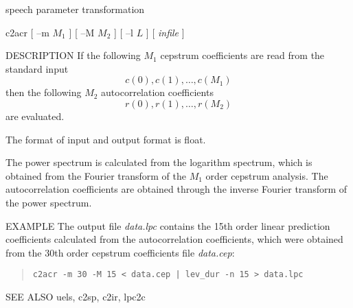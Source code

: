 %
{speech parameter transformation}

\begin{synopsis}
\item[c2acr] [ --m $M_1$ ] [ --M $M_2$ ] [ --l $L$ ] [ {\em infile} ]
\end{synopsis}

\begin{qsection}{DESCRIPTION}
If the following $M_1$ cepstrum coefficients
are read from the standard input
\begin{displaymath}
c(0), c(1), \ldots, c(M_1)
\end{displaymath}
then the following $M_2$ autocorrelation coefficients
\begin{displaymath}
r(0), r(1), \ldots, r(M_2)
\end{displaymath}
are evaluated.
\par
The format of input and output format is float.
\par
The power spectrum is calculated from the logarithm spectrum,
which is obtained from the Fourier transform of the $M_1$
order cepstrum analysis.
The autocorrelation coefficients are obtained through the inverse
Fourier transform of the power spectrum.
\end{qsection}

\begin{options}
\end{options}

\begin{qsection}{EXAMPLE}
The output file {\em data.lpc} contains the 15th order linear prediction
coefficients calculated from the autocorrelation coefficients,
which were obtained from the 30th order cepstrum coefficients
file {\em data.cep}:
\begin{quote}
  \verb!c2acr -m 30 -M 15 < data.cep | lev_dur -n 15 > data.lpc!
\end{quote}
\end{qsection}

\begin{qsection}{SEE ALSO}
  uels, c2sp, c2ir, lpc2c 
\end{qsection}
